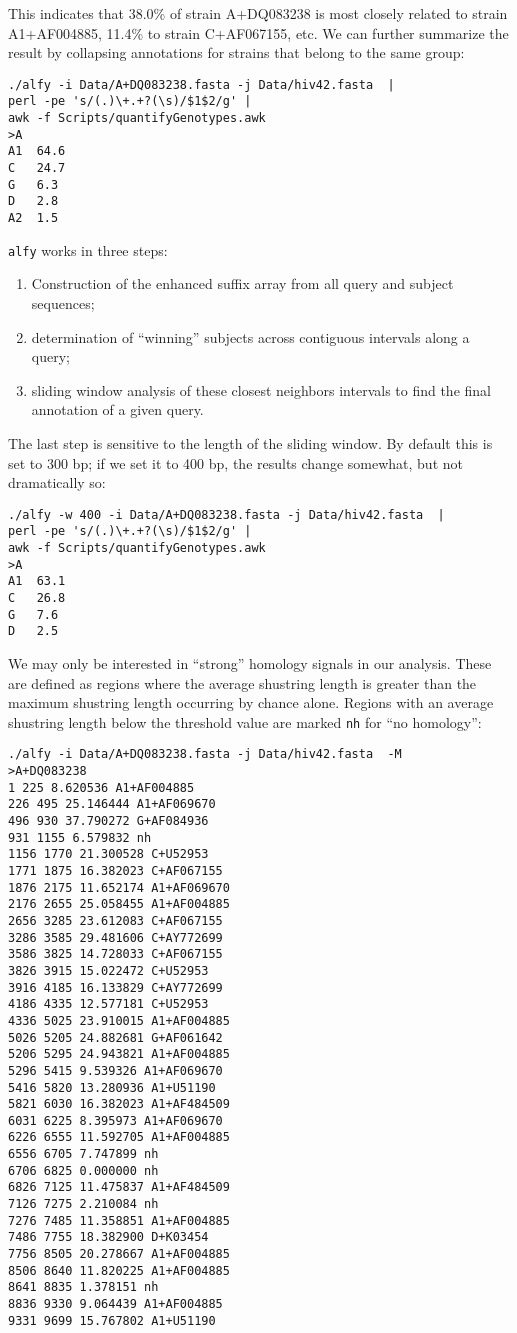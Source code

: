 \documentclass{article}
\newcommand{\be}{\begin{enumerate}}
\newcommand{\ee}{\end{enumerate}}
\newcommand{\I}{\item}
\newcommand{\ty}{\texttt}
\begin{document}
This indicates that 38.0\% of strain A+DQ083238 is most closely related
to strain A1+AF004885, 11.4\% to strain C+AF067155, etc. We can
further summarize the result by collapsing annotations for strains that
belong to the same group:
\begin{verbatim}
./alfy -i Data/A+DQ083238.fasta -j Data/hiv42.fasta  | 
perl -pe 's/(.)\+.+?(\s)/$1$2/g' | 
awk -f Scripts/quantifyGenotypes.awk
>A
A1	64.6
C	24.7
G	6.3
D	2.8
A2	1.5
\end{verbatim}
\I \ty{alfy} works in three steps:
\be
\I Construction of the enhanced suffix array from all query and
subject sequences;
\I determination of ``winning'' subjects across contiguous intervals
along a query;
\I sliding window analysis of these closest neighbors intervals to
find the final annotation of a given query.
\ee
The last step is sensitive to the length of the sliding window. By
default this is set to 300 bp; if we set it to 400 bp, the results
change somewhat, but not dramatically so:
\begin{verbatim}
./alfy -w 400 -i Data/A+DQ083238.fasta -j Data/hiv42.fasta  | 
perl -pe 's/(.)\+.+?(\s)/$1$2/g' | 
awk -f Scripts/quantifyGenotypes.awk
>A
A1	63.1
C	26.8
G	7.6
D	2.5
\end{verbatim}
\I We may only be interested in ``strong'' homology signals in our
analysis. These are defined as regions where the average shustring
length is greater than the maximum shustring length occurring by chance
alone. Regions with an average shustring length below the threshold value are
marked  \ty{nh} for ``no homology'':
\begin{verbatim}
./alfy -i Data/A+DQ083238.fasta -j Data/hiv42.fasta  -M
>A+DQ083238
1 225 8.620536 A1+AF004885
226 495 25.146444 A1+AF069670
496 930 37.790272 G+AF084936
931 1155 6.579832 nh
1156 1770 21.300528 C+U52953
1771 1875 16.382023 C+AF067155
1876 2175 11.652174 A1+AF069670
2176 2655 25.058455 A1+AF004885
2656 3285 23.612083 C+AF067155
3286 3585 29.481606 C+AY772699
3586 3825 14.728033 C+AF067155
3826 3915 15.022472 C+U52953
3916 4185 16.133829 C+AY772699
4186 4335 12.577181 C+U52953
4336 5025 23.910015 A1+AF004885
5026 5205 24.882681 G+AF061642
5206 5295 24.943821 A1+AF004885
5296 5415 9.539326 A1+AF069670
5416 5820 13.280936 A1+U51190
5821 6030 16.382023 A1+AF484509
6031 6225 8.395973 A1+AF069670
6226 6555 11.592705 A1+AF004885
6556 6705 7.747899 nh
6706 6825 0.000000 nh
6826 7125 11.475837 A1+AF484509
7126 7275 2.210084 nh
7276 7485 11.358851 A1+AF004885
7486 7755 18.382900 D+K03454
7756 8505 20.278667 A1+AF004885
8506 8640 11.820225 A1+AF004885
8641 8835 1.378151 nh
8836 9330 9.064439 A1+AF004885
9331 9699 15.767802 A1+U51190
\end{verbatim}
\end{document}
